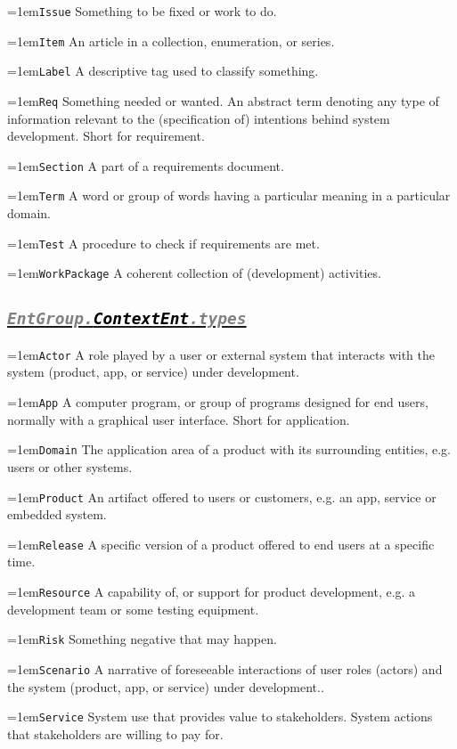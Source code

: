 \documentclass[a4paper,oneside]{article}
\newcommand\Concept[2]{\hangindent=1em\lstinline+#1+ #2}
\begin{document}
\begin{multicols*}{4}
\Concept{Issue}{Something to be fixed or work to do.}

\Concept{Item}{An article in a collection, enumeration, or series.}

\Concept{Label}{A descriptive tag used to classify something.}

\Concept{Req}{Something needed or wanted. An abstract term denoting any type of information relevant to the (specification of) intentions behind system development. Short for requirement.}

\Concept{Section}{A part of a requirements document.}

\Concept{Term}{A word or group of words having a particular meaning in a particular domain.}

\Concept{Test}{A procedure to check if requirements are met.}

\Concept{WorkPackage}{A coherent collection of (development) activities.}


\subsection*{\underline{\texttt{\textit{{\textcolor{gray}{EntGroup.}\textcolor{black}{ContextEnt}}\textcolor{gray}{.types}}}}}
\Concept{Actor}{A role played by a user or external system that interacts with the system (product, app, or service) under development.}

\Concept{App}{A computer program, or group of programs designed for end users, normally with a graphical user interface. Short for application.}

\Concept{Domain}{The application area of a product with its surrounding entities, e.g. users or other systems.}

\Concept{Product}{An artifact offered to users or customers, e.g. an app, service or  embedded system.}

\Concept{Release}{A specific version of a product offered to end users at a specific time.}

\Concept{Resource}{A capability of, or support for product development, e.g. a development team or some testing equipment.}

\Concept{Risk}{Something negative that may happen.}

\Concept{Scenario}{A narrative of foreseeable interactions of user roles (actors) and the system (product, app, or service) under development..}

\Concept{Service}{System use that provides value to stakeholders. System actions that stakeholders are willing to pay for.}


\end{multicols*}
\end{document}
